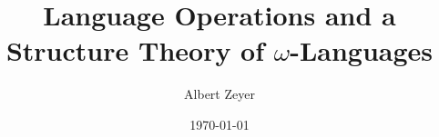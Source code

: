 \documentclass{article}
\begin{document}
\title{Language Operations and a Structure Theory of $\omega$-Languages}
\author{Albert Zeyer}
\date{\today}

\maketitle
\tableofcontents




%







\printindex
\end{document}
